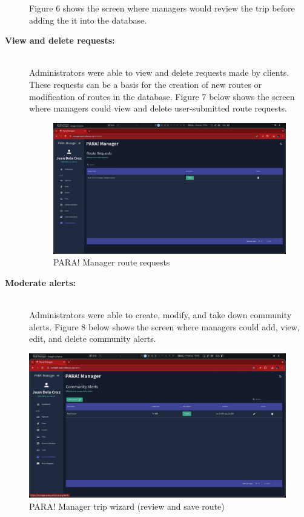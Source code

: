 \documentclass[journal]{./IEEE/IEEEtran}
\begin{document}
\begin{description}
Figure 6 shows the screen where managers would review the trip before adding the it into the database. \hfill \\

    \item[\textbf{View and delete requests:}] \hfill \\
       Administrators were able to view and delete requests made by clients. These requests can be a basis for the creation of new routes or modification of routes in the database.
Figure 7 below shows the screen where managers could view and delete user-submitted route requests.

\begin{figure}[!h]
    \centering
        \includegraphics[scale=0.115]{./figures/manager/route request.jpeg}
    \caption{PARA! Manager route requests}
\end{figure}
    
    \item[\textbf{Moderate alerts:}] \hfill \\
       Administrators were able to create, modify, and take down community alerts.
       Figure 8 below shows the screen where managers could add, view, edit, and delete community alerts.
\end{description}

\begin{figure}[!h]
    \centering
        \includegraphics[scale=0.115]{./figures/manager/alerts.jpeg}
    \caption{PARA! Manager trip wizard (review and save route)}
\end{figure}
\end{document}
